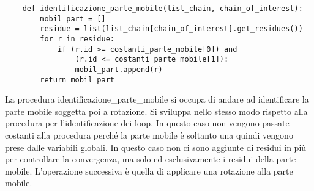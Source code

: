 \begin{verbatim}
    def identificazione_parte_mobile(list_chain, chain_of_interest):
        mobil_part = []
        residue = list(list_chain[chain_of_interest].get_residues())
        for r in residue:
            if (r.id >= costanti_parte_mobile[0]) and 
                (r.id <= costanti_parte_mobile[1]):
                mobil_part.append(r)
        return mobil_part
\end{verbatim}
La procedura identificazione\_parte\_mobile si occupa di andare ad identificare la parte mobile soggetta poi a rotazione. Si sviluppa nello stesso modo rispetto alla 
procedura per l'identificazione dei loop. In questo caso non vengono passate costanti alla procedura perché la parte mobile è soltanto una quindi vengono prese dalle
variabili globali. In questo caso non ci sono aggiunte di residui in più per controllare la convergenza, ma solo ed esclusivamente i residui della parte mobile.
L'operazione successiva è quella di applicare una rotazione alla parte mobile.

